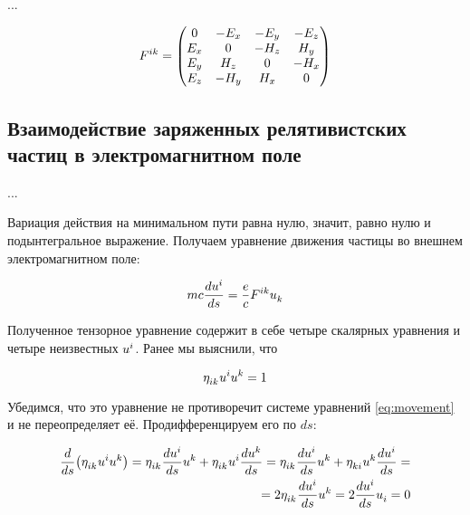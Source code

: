 \documentclass{article}
\begin{document}
...

\begin{equation}\label{eq:fmatrix}
    \tensor{F}{^i^k} =
    \begin{pmatrix}
        0 & -E_x & -E_y & -E_z \\
        E_x & 0 & -H_z & H_y \\
        E_y & H_z & 0 & -H_x \\
        E_z & -H_y & H_x & 0
    \end{pmatrix}
\end{equation}

\subsection{Взаимодействие заряженных релятивистских частиц в электромагнитном поле}

...

Вариация действия на минимальном пути равна нулю, значит, равно нулю и подынтегральное выражение. Получаем уравнение движения частицы во внешнем электромагнитном поле:

\begin{equation}\label{eq:movement}
    mc\frac{d\tensor{u}{^i}}{ds}=\frac{e}{c}\tensor{F}{^i^k}\tensor{u}{_k}
\end{equation}

Полученное тензорное уравнение содержит в себе четыре скалярных уравнения и четыре неизвестных $\tensor{u}{^i}$. Ранее мы выяснили, что 

\begin{equation}\label{eq:velnorm}
    \tensor{\eta}{_i_k}\tensor{u}{^i}\tensor{u}{^k}=1
\end{equation}

Убедимся, что это уравнение не противоречит системе уравнений \eqref{eq:movement} и не переопределяет её. Продифференцируем его по $ds$:

\begin{equation*}
    \begin{split}
        \frac{d}{ds}\big(\tensor{\eta}{_i_k}\tensor{u}{^i}\tensor{u}{^k}\big)=\tensor{\eta}{_i_k}\frac{d\tensor{u}{^i}}{ds}\tensor{u}{^k}+\tensor{\eta}{_i_k}\tensor{u}{^i}\frac{d\tensor{u}{^k}}{ds}=\tensor{\eta}{_i_k}\frac{d\tensor{u}{^i}}{ds}\tensor{u}{^k}+\tensor{\eta}{_k_i}\tensor{u}{^k}\frac{d\tensor{u}{^i}}{ds}=\\
        =2\tensor{\eta}{_i_k}\frac{d\tensor{u}{^i}}{ds}\tensor{u}{^k}=2\frac{d\tensor{u}{^i}}{ds}\tensor{u}{_i}=0
    \end{split}
\end{equation*}
\end{document}
